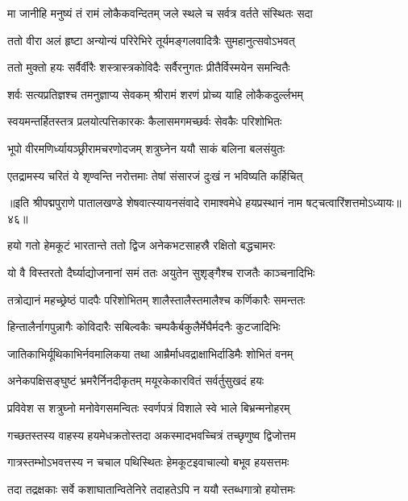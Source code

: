 \twolineshloka
{मा जानीहि मनुष्यं तं रामं लोकैकवन्दितम्}
{जले स्थले च सर्वत्र वर्तते संस्थितः सदा}%

\twolineshloka
{ततो वीरा अलं हृष्टा अन्योन्यं परिरेभिरे}
{तूर्यमङ्गलवादित्रैः सुमहानुत्सवोऽभवत्}%

\twolineshloka
{ततो मुक्तो हयः सर्वैर्वीरैः शस्त्रास्त्रकोविदैः}
{सर्वैरनुगतः प्रीतैर्विस्मयेन समन्वितैः}%

\twolineshloka
{शर्वः सत्यप्रतिज्ञश्च तमनुज्ञाप्य सेवकम्}
{श्रीरामं शरणं प्रोच्य याहि लोकैकदुर्ल्लभम्}%

\twolineshloka
{स्वयमन्तर्हितस्तत्र प्रलयोत्पत्तिकारकः}
{कैलासमगमच्छर्वः सेवकैः परिशोभितः}%

\twolineshloka
{भूपो वीरमणिर्ध्यायञ्छ्रीरामचरणोदजम्}
{शत्रुघ्नेन ययौ साकं बलिना बलसंयुतः}%

\twolineshloka
{एतद्रामस्य चरितं ये शृण्वन्ति नरोत्तमाः}
{तेषां संसारजं दुःखं न भविष्यति कर्हिचित्}%

॥इति श्रीपद्मपुराणे पातालखण्डे शेषवात्स्यायनसंवादे रामाश्वमेधे हयप्रस्थानं नाम षट्चत्वारिंशत्तमोऽध्यायः॥४६॥



\twolineshloka
{हयो गतो हेमकूटं भारतान्ते ततो द्विज}
{अनेकभटसाहस्रै रक्षितो बद्धचामरः}%

\twolineshloka
{यो वै विस्तरतो दैर्घ्याद्योजनानां समं ततः}
{अयुतेन सुशृङ्गैश्च राजतैः काञ्चनादिभिः}%

\twolineshloka
{तत्रोद्यानं महच्छ्रेष्ठं पादपैः परिशोभितम्}
{शालैस्तालैस्तमालैश्च कर्णिकारैः समन्ततः}%

\twolineshloka
{हिन्तालैर्नागपुन्नागैः कोविदारैः सबिल्वकैः}
{चम्पकैर्बकुलैर्मेघैर्मदनैः कुटजादिभिः}%

\twolineshloka
{जातिकाभिर्यूथिकाभिर्नवमालिकया तथा}
{आम्रैर्माधवद्राक्षाभिर्दाडिमैः शोभितं वनम्}%

\twolineshloka
{अनेकपक्षिसङ्घुष्टं भ्रमरैर्निनदीकृतम्}
{मयूरकेकारवितं सर्वर्तुसुखदं हयः}%

\twolineshloka
{प्रविवेश स शत्रुघ्नो मनोवेगसमन्वितः}
{स्वर्णपत्रं विशाले स्वे भाले बिभ्रन्मनोहरम्}%

\twolineshloka
{गच्छतस्तस्य वाहस्य हयमेधक्रतोस्तदा}
{अकस्मादभवच्चित्रं तच्छृणुष्व द्विजोत्तम}%

\twolineshloka
{गात्रस्तम्भोऽभवत्तस्य न चचाल पथिस्थितः}
{हेमकूटइवाचाल्यो बभूव हयसत्तमः}%

\twolineshloka
{तदा तद्रक्षकाः सर्वे कशाघातान्वितेनिरे}
{तदाहतेऽपि न ययौ स्तब्धगात्रो हयोत्तमः}%

